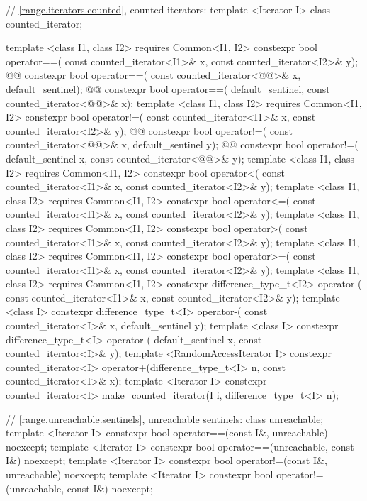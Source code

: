 {\begin{codeblock}
{{    // \ref{range.iterators.counted}, counted iterators:
    template <Iterator I> class counted_iterator;

    template <class I1, class I2>
        requires Common<I1, I2>
      constexpr bool operator==(
        const counted_iterator<I1>& x, const counted_iterator<I2>& y);
    @@
      constexpr bool operator==(
        const counted_iterator<@@>& x, default_sentinel);
    @@
      constexpr bool operator==(
        default_sentinel, const counted_iterator<@@>& x);
    template <class I1, class I2>
        requires Common<I1, I2>
      constexpr bool operator!=(
        const counted_iterator<I1>& x, const counted_iterator<I2>& y);
    @@
      constexpr bool operator!=(
        const counted_iterator<@@>& x, default_sentinel y);
    @@
      constexpr bool operator!=(
        default_sentinel x, const counted_iterator<@@>& y);
    template <class I1, class I2>
        requires Common<I1, I2>
      constexpr bool operator<(
        const counted_iterator<I1>& x, const counted_iterator<I2>& y);
    template <class I1, class I2>
        requires Common<I1, I2>
      constexpr bool operator<=(
        const counted_iterator<I1>& x, const counted_iterator<I2>& y);
    template <class I1, class I2>
        requires Common<I1, I2>
      constexpr bool operator>(
        const counted_iterator<I1>& x, const counted_iterator<I2>& y);
    template <class I1, class I2>
        requires Common<I1, I2>
      constexpr bool operator>=(
        const counted_iterator<I1>& x, const counted_iterator<I2>& y);
    template <class I1, class I2>
        requires Common<I1, I2>
      constexpr difference_type_t<I2> operator-(
        const counted_iterator<I1>& x, const counted_iterator<I2>& y);
    template <class I>
      constexpr difference_type_t<I> operator-(
        const counted_iterator<I>& x, default_sentinel y);
    template <class I>
      constexpr difference_type_t<I> operator-(
        default_sentinel x, const counted_iterator<I>& y);
    template <RandomAccessIterator I>
      constexpr counted_iterator<I>
        operator+(difference_type_t<I> n, const counted_iterator<I>& x);
    template <Iterator I>
      constexpr counted_iterator<I> make_counted_iterator(I i, difference_type_t<I> n);

    // \ref{range.unreachable.sentinels}, unreachable sentinels:
    class unreachable;
    template <Iterator I>
      constexpr bool operator==(const I&, unreachable) noexcept;
    template <Iterator I>
      constexpr bool operator==(unreachable, const I&) noexcept;
    template <Iterator I>
      constexpr bool operator!=(const I&, unreachable) noexcept;
    template <Iterator I>
      constexpr bool operator!=(unreachable, const I&) noexcept;

}}
\end{codeblock}}
